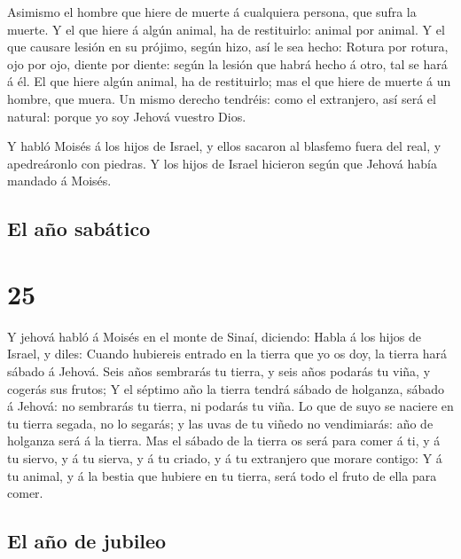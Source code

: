  Asimismo el hombre que hiere de muerte á cualquiera
persona, que sufra la muerte.  Y el que hiere á algún
animal, ha de restituirlo: animal por animal.  Y el que
causare lesión en su prójimo, según hizo, así le sea hecho:
 Rotura por rotura, ojo por ojo, diente por diente: según
la lesión que habrá hecho á otro, tal se hará á él.  El que
hiere algún animal, ha de restituirlo; mas el que hiere de muerte á un
hombre, que muera.  Un mismo derecho tendréis: como el
extranjero, así será el natural: porque yo soy Jehová vuestro Dios.

 Y habló Moisés á los hijos de Israel, y ellos sacaron al
blasfemo fuera del real, y apedreáronlo con piedras. Y los hijos de
Israel hicieron según que Jehová había mandado á Moisés.

\hypertarget{el-auxf1o-sabuxe1tico}{%
\subsection{El año sabático}\label{el-auxf1o-sabuxe1tico}}

\hypertarget{section-24}{%
\section{25}\label{section-24}}

 Y jehová habló á Moisés en el monte de Sinaí, diciendo:
 Habla á los hijos de Israel, y diles: Cuando hubiereis
entrado en la tierra que yo os doy, la tierra hará sábado á Jehová.
 Seis años sembrarás tu tierra, y seis años podarás tu viña,
y cogerás sus frutos;  Y el séptimo año la tierra tendrá
sábado de holganza, sábado á Jehová: no sembrarás tu tierra, ni podarás
tu viña.  Lo que de suyo se naciere en tu tierra segada, no
lo segarás; y las uvas de tu viñedo no vendimiarás: año de holganza será
á la tierra.  Mas el sábado de la tierra os será para comer
á ti, y á tu siervo, y á tu sierva, y á tu criado, y á tu extranjero que
morare contigo:  Y á tu animal, y á la bestia que hubiere en
tu tierra, será todo el fruto de ella para comer.

\hypertarget{el-auxf1o-de-jubileo}{%
\subsection{El año de jubileo}\label{el-auxf1o-de-jubileo}}

